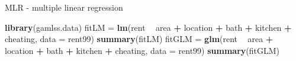 \documentclass[ignorenonframetext,]{beamer}
\newenvironment{Shaded}{\begin{snugshade}}{\end{snugshade}}
\newcommand{\KeywordTok}[1]{\textcolor[rgb]{0.13,0.29,0.53}{\textbf{#1}}}
\newcommand{\DataTypeTok}[1]{\textcolor[rgb]{0.13,0.29,0.53}{#1}}
\newcommand{\StringTok}[1]{\textcolor[rgb]{0.31,0.60,0.02}{#1}}
\newcommand{\OperatorTok}[1]{\textcolor[rgb]{0.81,0.36,0.00}{\textbf{#1}}}
\newcommand{\NormalTok}[1]{#1}
\begin{document}
\begin{frame}[fragile]

\begin{block}{MLR - multiple linear regression}

\begin{Shaded}
\begin{Highlighting}[]
\KeywordTok{library}\NormalTok{(gamlss.data)}
\NormalTok{fitLM =}\StringTok{ }\KeywordTok{lm}\NormalTok{(rent }\OperatorTok{~}\StringTok{ }\NormalTok{area }\OperatorTok{+}\StringTok{ }\NormalTok{location }\OperatorTok{+}\StringTok{ }\NormalTok{bath }\OperatorTok{+}\StringTok{ }\NormalTok{kitchen }\OperatorTok{+}\StringTok{ }\NormalTok{cheating, }\DataTypeTok{data =}\NormalTok{ rent99)}
\KeywordTok{summary}\NormalTok{(fitLM)}
\NormalTok{fitGLM =}\StringTok{ }\KeywordTok{glm}\NormalTok{(rent }\OperatorTok{~}\StringTok{ }\NormalTok{area }\OperatorTok{+}\StringTok{ }\NormalTok{location }\OperatorTok{+}\StringTok{ }\NormalTok{bath }\OperatorTok{+}\StringTok{ }\NormalTok{kitchen }\OperatorTok{+}\StringTok{ }\NormalTok{cheating, }\DataTypeTok{data =}\NormalTok{ rent99)}
\KeywordTok{summary}\NormalTok{(fitGLM)}
\end{Highlighting}
\end{Shaded}


\end{block}
\end{frame}
\end{document}
